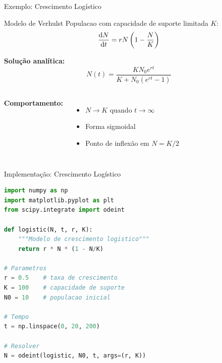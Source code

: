 \begin{frame}[shrink=15]{Exemplo: Crescimento Logístico}
\begin{block}{Modelo de Verhulst}
Populacao com capacidade de suporte limitada $K$:
\begin{equation*}
\frac{\mathrm{d} N}{\mathrm{d} t} = rN\left(1 - \frac{N}{K}\right)
\end{equation*}
\end{block}

\textbf{Solução analítica:}
\begin{equation*}
N(t) = \frac{K N_0 e^{rt}}{K + N_0(e^{rt} - 1)}
\end{equation*}

\small
\begin{columns}
\textbf{Comportamento:}
\begin{itemize}
    \item $N \to K$ quando $t \to \infty$
    \item Forma sigmoidal
    \item Ponto de inflexão em $N = K/2$
\end{itemize}

\begin{center}
\end{center}
\end{columns}
\end{frame}

\begin{frame}{Implementação: Crescimento Logístico}
\begin{lstlisting}[language=Python, caption=Modelo logístico, basicstyle=\ttfamily\footnotesize]
import numpy as np
import matplotlib.pyplot as plt
from scipy.integrate import odeint

def logistic(N, t, r, K):
    """Modelo de crescimento logistico"""
    return r * N * (1 - N/K)

# Parametros
r = 0.5    # taxa de crescimento
K = 100    # capacidade de suporte
N0 = 10    # populacao inicial

# Tempo
t = np.linspace(0, 20, 200)

# Resolver
N = odeint(logistic, N0, t, args=(r, K))
\end{lstlisting}
\end{frame}

